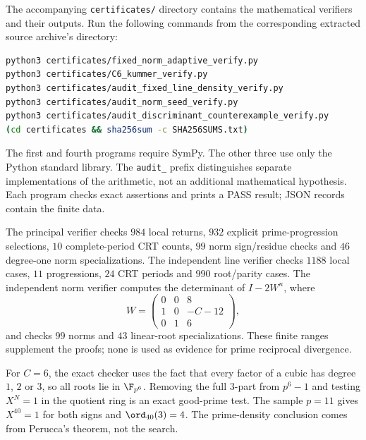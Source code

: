 \documentclass[11pt,a4paper]{article}
\theoremstyle{definition}\newtheorem{definition}[theorem]{Definition}
\theoremstyle{remark}\newtheorem{remark}[theorem]{Remark}
\begin{document}
The accompanying \texttt{certificates/} directory contains the mathematical
verifiers and their outputs.
Run the following commands from the corresponding extracted source archive's directory:
\begin{lstlisting}[language=bash]
python3 certificates/fixed_norm_adaptive_verify.py
python3 certificates/C6_kummer_verify.py
python3 certificates/audit_fixed_line_density_verify.py
python3 certificates/audit_norm_seed_verify.py
python3 certificates/audit_discriminant_counterexample_verify.py
(cd certificates && sha256sum -c SHA256SUMS.txt)
\end{lstlisting}
The first and fourth programs require SymPy. The other three use only
the Python standard library. The \texttt{audit\_} prefix distinguishes
separate implementations of the arithmetic, not an additional mathematical
hypothesis. Each program checks exact assertions and prints a PASS result;
JSON records contain the finite data.

The principal verifier checks $984$ local returns, $932$ explicit
prime-progression selections, $10$ complete-period CRT counts, $99$ norm
sign/residue checks and $46$ degree-one norm specializations.
The independent line verifier checks $1188$ local cases, $11$ progressions,
$24$ CRT periods and $990$ root/parity cases.
The independent norm verifier computes the determinant of $I-2W^n$,
where
\[
                        W=\begin{pmatrix}0&0&8\\1&0&-C-12\\0&1&6\end{pmatrix},
\]
and checks $99$ norms and $43$ linear-root specializations.
These finite ranges supplement the proofs; none is used as evidence
for prime reciprocal divergence.

For $C=6$, the exact checker uses the fact that every factor of a cubic
has degree $1$, $2$ or $3$, so all roots lie in $\F_{p^6}$.
Removing the full $3$-part from $p^6-1$ and testing $X^N=1$ in the
quotient ring is an exact good-prime test. The sample $p=11$ gives
$X^{40}=1$ for both signs and $\ord_{40}(3)=4$.
The prime-density conclusion comes from Perucca's theorem, not the search.
\end{document}
